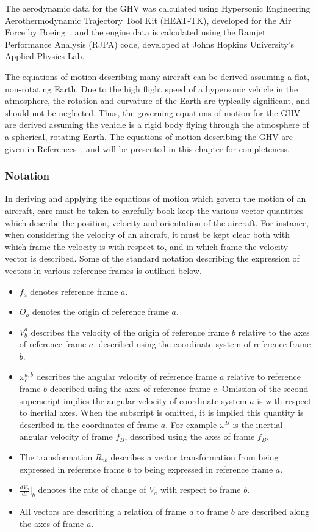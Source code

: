 The aerodynamic data for the GHV was calculated using Hypersonic Engineering Aerothermodynamic Trajectory Tool Kit (HEAT-TK), developed for the Air Force by Boeing\ \cite{carter.heattk.2005}, and the engine data is calculated using the Ramjet Performance Analysis (RJPA) code, developed at Johns Hopkins University's Applied Physics Lab.

The equations of motion describing many aircraft can be derived assuming a flat, non-rotating Earth.
Due to the high flight speed of a hypersonic vehicle in the atmosphere, the rotation and curvature of the Earth are typically significant, and should not be neglected.
Thus, the governing equations of motion for the GHV are derived assuming the vehicle is a rigid body flying through the atmosphere of a spherical, rotating Earth.
The equations of motion describing the GHV are given in References\ \cite{billamoria.eom.1995, etkin.atmosphericflight.1972}, and will be presented in this chapter for completeness.

\subsubsection{Notation}
In deriving and applying the equations of motion which govern the motion of an aircraft, care must be taken to carefully book-keep the various vector quantities which describe the position, velocity and orientation of the aircraft.
For instance, when considering the velocity of an aircraft, it must be kept clear both with which frame the velocity is with respect to, and in which frame the velocity vector is described.
Some of the standard notation describing the expression of vectors in various reference frames is outlined below.
\begin{itemize}
  \item{$f_{a}$ denotes reference frame $a$.}
  \item{$O_{a}$ denotes the origin of reference frame $a$.}
  \item{$V^{a}_{b}$ describes the velocity of the origin of reference frame $b$ relative to the axes of reference frame $a$, described using the coordinate system of reference frame $b$.}
  \item{$\omega^{a,b}_{c}$ describes the angular velocity of reference frame $a$ relative to reference frame $b$ described using the axes of reference frame $c$. Omission of the second superscript implies the angular velocity of coordinate system $a$ is with respect to inertial axes. When the subscript is omitted, it is implied this quantity is described in the coordinates of frame $a$. For example $\omega^{B}$ is the inertial angular velocity of frame $f_{B}$, described using the axes of frame $f_{B}$.}
  \item{The transformation $R_{ab}$ describes a vector transformation from being expressed in reference frame $b$ to being expressed in reference frame $a$.}
  \item{$\frac{dV_{a}}{dt}\bigr|_{b}$ denotes the rate of change of $V_{a}$ with respect to frame $b$.}
  \item{All vectors are describing a relation of frame $a$ to frame $b$ are described along the axes of frame $a$.}
\end{itemize}

